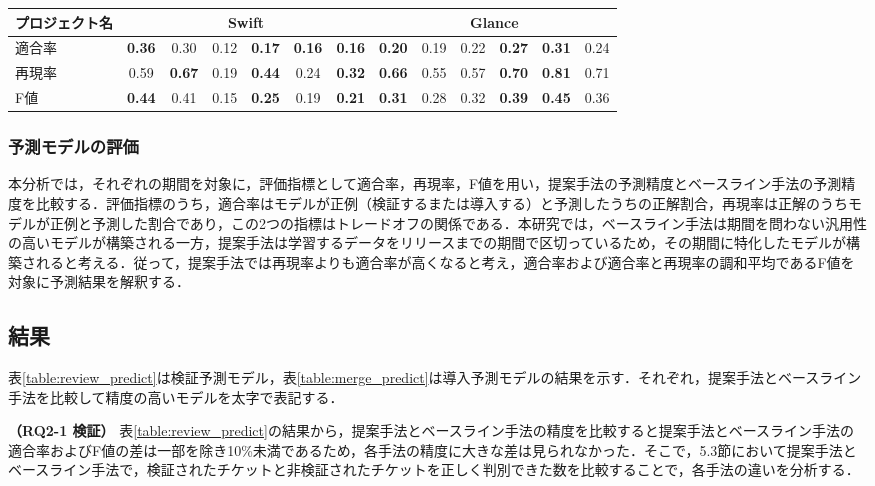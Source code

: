 \documentclass[T,J]{fose} %
\begin{document}
\begin{table}[t]
{\begin{tabular}{l|cc|cc|cc|cc|cc|cc}
プロジェクト名               & \multicolumn{6}{c|}{Swift}                                                & \multicolumn{6}{c}{Glance}                                               \\ \hline
適合率                   & {\textbf{0.36}}       & 0.30      & 0.12       & {\textbf{0.17}}      & {\textbf{0.16}}       & {\textbf{0.16}}      & {\textbf{0.20}}       & 0.19      & 0.22       & {\textbf{0.27}}      & {\textbf{0.31}}       & 0.24      \\
再現率                   & 0.59       & {\textbf{0.67}}      & 0.19       & {\textbf{0.44}}      & 0.24       & {\textbf{0.32}}      & {\textbf{0.66}}       & 0.55      & 0.57       & {\textbf{0.70}}      & {\textbf{0.81}}       & 0.71      \\
F値                    & {\textbf{0.44}}       & 0.41      & 0.15       & {\textbf{0.25}}      & 0.19       & {\textbf{0.21}}      & {\textbf{0.31}}       & 0.28      & 0.32       & {\textbf{0.39}}      & {\textbf{0.45}}       & 0.36     \\ \hline
\end{tabular}

}
\end{table}

\subsubsection{予測モデルの評価}
本分析では，それぞれの期間を対象に，評価指標として適合率，再現率，F値を用い，提案手法の予測精度とベースライン手法の予測精度を比較する．評価指標のうち，適合率はモデルが正例（検証するまたは導入する）と予測したうちの正解割合，再現率は正解のうちモデルが正例と予測した割合であり，この2つの指標はトレードオフの関係である．本研究では，ベースライン手法は期間を問わない汎用性の高いモデルが構築される一方，提案手法は学習するデータをリリースまでの期間で区切っているため，その期間に特化したモデルが構築されると考える．従って，提案手法では再現率よりも適合率が高くなると考え，適合率および適合率と再現率の調和平均であるF値を対象に予測結果を解釈する．

\subsection{結果}
表\ref{table:review_predict}は検証予測モデル，表\ref{table:merge_predict}は導入予測モデルの結果を示す．それぞれ，提案手法とベースライン手法を比較して精度の高いモデルを太字で表記する．

\textbf{（RQ2-1 検証）} 表\ref{table:review_predict}の結果から，提案手法とベースライン手法の精度を比較すると提案手法とベースライン手法の適合率およびF値の差は一部を除き10\%未満であるため，各手法の精度に大きな差は見られなかった．そこで，5.3節において提案手法とベースライン手法で，検証されたチケットと非検証されたチケットを正しく判別できた数を比較することで，各手法の違いを分析する．
\end{document}
